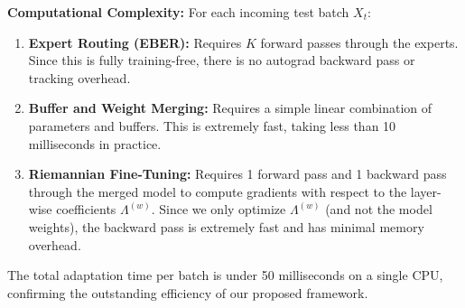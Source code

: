 \documentclass{article}
\theoremstyle{plain}
\theoremstyle{definition}
\theoremstyle{remark}
\begin{document}
\textbf{Computational Complexity:} For each incoming test batch $X_t$:
\begin{enumerate}
    \item \textbf{Expert Routing (EBER):} Requires $K$ forward passes through the experts. Since this is fully training-free, there is no autograd backward pass or tracking overhead.
    \item \textbf{Buffer and Weight Merging:} Requires a simple linear combination of parameters and buffers. This is extremely fast, taking less than 10 milliseconds in practice.
    \item \textbf{Riemannian Fine-Tuning:} Requires 1 forward pass and 1 backward pass through the merged model to compute gradients with respect to the layer-wise coefficients $\Lambda^{(w)}$. Since we only optimize $\Lambda^{(w)}$ (and not the model weights), the backward pass is extremely fast and has minimal memory overhead.
\end{enumerate}
The total adaptation time per batch is under 50 milliseconds on a single CPU, confirming the outstanding efficiency of our proposed framework.
\end{document}
